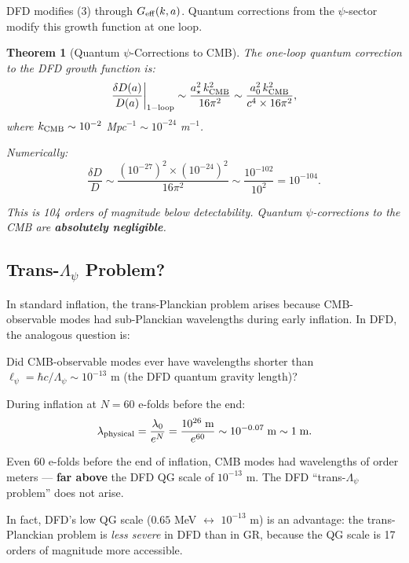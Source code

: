 \documentclass[11pt,a4paper]{article}
\newtheorem{theorem}{Theorem}
\begin{document}
DFD modifies (3) through $G_{\rm eff}(k,a)$. Quantum corrections from the $\psi$-sector modify this growth function at one loop.

\begin{theorem}[Quantum $\psi$-Corrections to CMB]
\label{thm:CMB-quantum}
The one-loop quantum correction to the DFD growth function is:
\begin{equation}
\frac{\delta D(a)}{D(a)}\bigg|_{\rm 1-loop} \sim \frac{a_\star^2\,k_{\rm CMB}^2}{16\pi^2}
\sim \frac{a_0^2\,k_{\rm CMB}^2}{c^4\times 16\pi^2},
\end{equation}
where $k_{\rm CMB} \sim 10^{-2}$ Mpc$^{-1} \sim 10^{-24}$ m$^{-1}$.

Numerically:
\begin{equation}
\frac{\delta D}{D} \sim \frac{(10^{-27})^2\times (10^{-24})^2}{16\pi^2}
\sim \frac{10^{-102}}{10^2} = 10^{-104}.
\end{equation}

This is 104 orders of magnitude below detectability. Quantum $\psi$-corrections to the CMB are \textbf{absolutely negligible}.
\end{theorem}

\subsection{Trans-$\Lambda_\psi$ Problem?}
\label{sec:trans-Planck}

In standard inflation, the trans-Planckian problem arises because CMB-observable modes had sub-Planckian wavelengths during early inflation. In DFD, the analogous question is:

Did CMB-observable modes ever have wavelengths shorter than $\ell_\psi = \hbar c/\Lambda_\psi \sim 10^{-13}$ m (the DFD quantum gravity length)?

During inflation at $N = 60$ e-folds before the end:
\begin{equation}
\lambda_{\rm physical} = \frac{\lambda_0}{e^N} = \frac{10^{26}\;\text{m}}{e^{60}} \sim 10^{-0.07}\;\text{m} \sim 1\;\text{m}.
\end{equation}

Even 60 e-folds before the end of inflation, CMB modes had wavelengths of order meters --- \textbf{far above} the DFD QG scale of $10^{-13}$ m. The DFD ``trans-$\Lambda_\psi$ problem'' does not arise.

In fact, DFD's low QG scale ($0.65$ MeV $\leftrightarrow$ $10^{-13}$ m) is an advantage: the trans-Planckian problem is \emph{less severe} in DFD than in GR, because the QG scale is 17 orders of magnitude more accessible.
\end{document}
